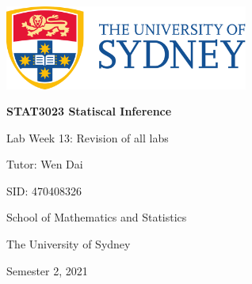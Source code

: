 \includegraphics[width=8cm]{./UsydLogo}

\vspace{1cm}


\horline
{\centering\bfseries \Large \textsc{STAT3023} Statiscal Inference

}
\horline

\vspace{3cm}

{\large \centering Lab Week 13: Revision of all labs

}

{\centering

\vspace{1cm}

Tutor: Wen Dai

SID: 470408326

\vspace{1cm}

School of Mathematics and Statistics

The University of Sydney

\vfill

Semester 2, 2021\newpage

}
